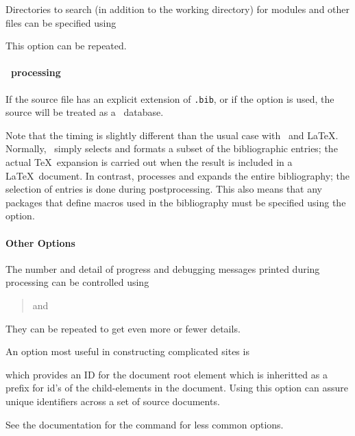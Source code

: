\documentclass{book}
\begin{document}
Directories to search (in addition to the working directory)
for modules and other files can be specified using
\begin{quote}
\end{quote}
This option can be repeated.

\paragraph{\BibTeX\ processing}
If the source file has an explicit extension of \texttt{.bib},
or if the  option is used, the source will be
treated as a \BibTeX\ database.

Note that the timing is slightly different than the usual
case with \BibTeX\ and \LaTeX.  Normally, \BibTeX\ simply
selects and formats a subset of the bibliographic entries; the
actual \TeX\ expansion is carried out when the result is included
in a \LaTeX\ document.  In contrast,  processes and expands
the entire bibliography; the selection of entries is done
during postprocessing.  This also means that any packages
that define macros used in the bibliography must be
specified using the  option.

\paragraph{Other Options}
The number and detail of progress and debugging messages printed
during processing can be controlled using
\begin{quote}
   and 
\end{quote}
They can  be repeated to get even more or fewer details.

An option most useful in constructing complicated sites is
\begin{quote}
\end{quote}
which provides an ID for the document root element which is inheritted
as a prefix for id's of the child-elements in the document.
Using this option can assure unique identifiers across a set
of source documents.

See the documentation for the command  for
less common options.

\end{document}
